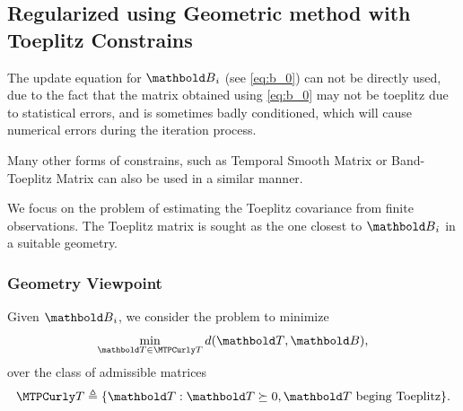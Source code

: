 \subsection{Regularized using Geometric method with Toeplitz Constrains}
The update equation for $\ve{B}_i$ (see \eqref{eq:b_0}) can not be directly used,
due to the fact that the matrix obtained using \eqref{eq:b_0} may not be toeplitz 
due to statistical errors, and is sometimes badly conditioned,
which will cause numerical errors during the iteration process.

Many other forms of constrains, such as Temporal Smooth Matrix\cite{Chen2007,Zhou2011}
or Band-Toeplitz Matrix can also be used in a similar manner.

We focus on the problem of estimating the Toeplitz covariance from 
finite observations. 
The Toeplitz matrix is sought as the one closest to $\ve{B}_i$ in a 
suitable geometry. 

\subsubsection{Geometry Viewpoint}
Given $\ve{B}_i$, we consider the problem to minimize
\begin{equation}
\min_{\ve{T}\in\mathcal{T}} d(\ve{T},\ve{B}),
\end{equation}
over the class of admissible matrices
\begin{equation}
\mathcal{T} \triangleq \{\ve{T}:\ve{T}\succeq0, \ve{T}~\text{beging Toeplitz}\}.
\end{equation}



